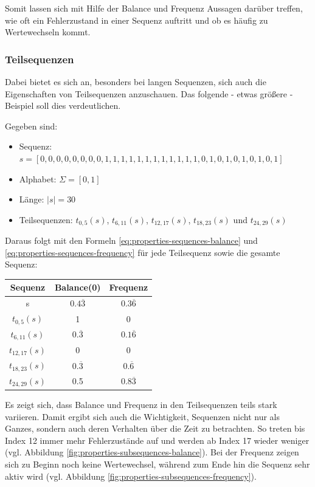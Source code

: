 Somit lassen sich mit Hilfe der Balance und Frequenz Aussagen darüber treffen, wie oft ein Fehlerzustand in einer Sequenz auftritt und ob es häufig zu Wertewechseln kommt. 

\subsubsection{Teilsequenzen}

Dabei bietet es sich an, besonders bei langen Sequenzen, sich auch die Eigenschaften von Teilsequenzen anzuschauen. Das folgende - etwas größere - Beispiel soll dies verdeutlichen.

\begin{theorem}
Gegeben sind:
\begin{itemize}[noitemsep]
	\item Sequenz: $s = [0,0,0,0,0,0,0,0,1,1,1,1,1,1,1,1,1,1,1,1,0,1,0,1,0,1,0,1,0,1]$
	\item Alphabet: $\Sigma = [0,1]$
	\item Länge: $|s| = 30$
	\item Teilsequenzen: $t_{0,5}(s)$, $t_{6,11}(s)$, $t_{12,17}(s)$, $t_{18,23}(s)$ und $t_{24,29}(s)$
\end{itemize}
Daraus folgt mit den Formeln \ref{eq:properties-sequences-balance} und \ref{eq:properties-sequences-frequency} für jede Teilsequenz sowie die gesamte Sequenz:

\begin{center}
	\begin{tabular}{|c c c|}
		\hline
		Sequenz & Balance(0) & Frequenz \\
		\hline\hline
		s & $0.4\overline{3}$ & $0.3\overline{6}$ \\ 
		\hline
		$t_{0,5}(s)$ & 1 & 0 \\ 
		\hline
		$t_{6,11}(s)$ & $0.\overline{3}$ & $0.1\overline{6}$ \\
		\hline
		$t_{12,17}(s)$ & 0 & 0 \\
		\hline
		$t_{18,23}(s)$ & $0.\overline{3}$ & $0.\overline{6}$ \\
		\hline
		$t_{24,29}(s)$ & 0.5 & $0.8\overline{3}$ \\
		\hline
	\end{tabular}
\end{center}

Es zeigt sich, dass Balance und Frequenz in den Teilsequenzen teils stark variieren. Damit ergibt sich auch die Wichtigkeit, Sequenzen nicht nur als Ganzes, sondern auch deren Verhalten über die Zeit zu betrachten. So treten bis Index 12 immer mehr Fehlerzustände auf und werden ab Index 17 wieder weniger (vgl. Abbildung \ref{fig:properties-subsequences-balance}). Bei der Frequenz zeigen sich zu Beginn noch keine Wertewechsel, während zum Ende hin die Sequenz sehr aktiv wird (vgl. Abbildung \ref{fig:properties-subsequences-frequency}).


\end{theorem}
